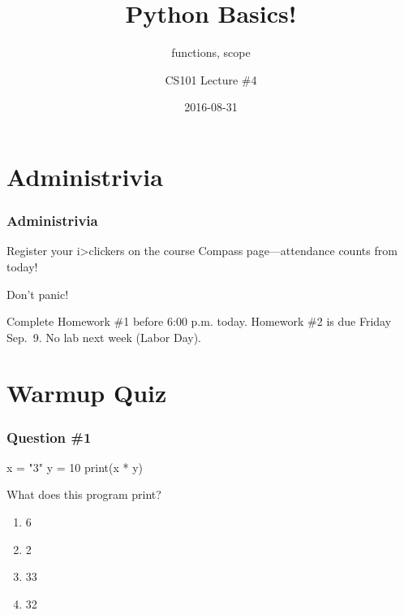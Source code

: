 \documentclass[11pt]{beamer}
\title{Python Basics!}
\subtitle{functions, scope}
\author{CS101 Lecture \#4}
\date{2016-08-31}
\begin{document}
  \setcounter{showProgressBar}{0}
  \setcounter{showSlideNumbers}{0}

\frame{\titlepage}

\setcounter{framenumber}{0}
\setcounter{showProgressBar}{1}
\setcounter{showSlideNumbers}{1}

\section{Administrivia}

\begin{frame}
  \frametitle{Administrivia}
  \Enlarge
  \begin{itemize}
  \myitem  Register your i>clickers on the course Compass page---attendance counts from today! \pause
    \begin{itemize}
    \mysubitem  Don't panic! \pause
    \end{itemize}
  \myitem  Complete Homework \#1 before 6:00 p.m. today. \pause
  \myitem  Homework \#2 is due Friday Sep.\ 9. \pause
  \myitem  No lab next week (Labor Day).
  \end{itemize}
\end{frame}

\section{Warmup Quiz}

\begin{frame}[fragile]
  \frametitle{Question \#1}
  \Enlarge

  \begin{semiverbatim}
x = "3"
y = 10 %
print(x * y)
  \end{semiverbatim}
  What does this program print?
  \begin{enumerate}[label=\Alph*]
  \item  6
  \item  2
  \item  33
  \item  32
  \end{enumerate}
\end{frame}
\end{document}
